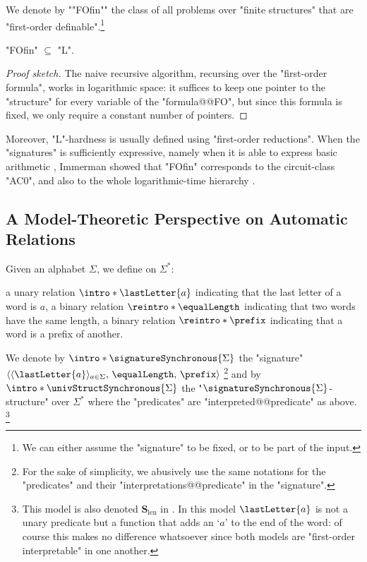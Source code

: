 We denote by \AP""FOfin"" the class of all problems over "finite structures" that are "first-order definable".\footnote{We can either assume the "signature" to be fixed, or to be part of the input.}

\begin{proposition}[Folklore]
	\label{prop:FO-in-L}
	"FOfin" $\subseteq$ "L".
\end{proposition}

\begin{proof}[Proof sketch]
	The naive recursive algorithm, recursing over the "first-order formula",
	works in logarithmic space: it suffices to keep one pointer to the "structure"
	for every variable of the "formula@@FO", but since this formula is fixed, we only
	require a constant number of pointers.
\end{proof}

Moreover, "L"-hardness is usually defined using "first-order reductions".
When the "signatures" is sufficiently expressive, namely when it is able to
express basic arithmetic \cite[Proviso~1.14]{Immerman1998DescriptiveComplexity},
Immerman showed that "FOfin" corresponds to the circuit-class "AC0",
and also to the whole logarithmic-time hierarchy
\cite[Corollary~5.32]{Immerman1998DescriptiveComplexity}.


\subsection{A Model-Theoretic Perspective on Automatic Relations}

Given an alphabet $\Sigma$, we define on $\Sigma^*$:
\begin{itemize}
	\itemAP a unary relation $\intro*\lastLetter{a}$ indicating that the last letter of a word is $a$,
	\itemAP a binary relation $\reintro*\equalLength$ indicating that two words have the same length,
	\itemAP a binary relation $\reintro*\prefix$ indicating that a word is a prefix of another.
\end{itemize} 
We denote by $\intro*\signatureSynchronous{\Sigma}$ the "signature" $\langle \langle\lastLetter{a}\rangle_{a \in \Sigma},\, \equalLength,\, \prefix \rangle$%
\footnote{For the sake of simplicity, we abusively use the same notations for
the "predicates" and their "interpretations@@predicate" in the "signature".} and
by \AP$\intro*\univStructSynchronous{\Sigma}$ the "$\signatureSynchronous{\Sigma}$-structure"
over $\Sigma^*$ where the "predicates" are "interpreted@@predicate" as above.%
\footnote{This model is also denoted $\symbf{S}_{\mathrm{len}}$ in \cite{BenediktLibkinSchwentickSegoufin2003DefinableRelations}. In this model $\lastLetter{a}$ is
not a unary predicate but a function that adds an `$a$' to the end of the word: of course this
makes no difference whatsoever since both models are "first-order interpretable" in one another.}

